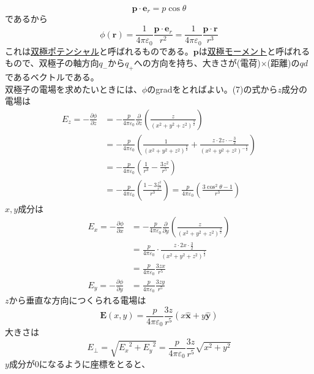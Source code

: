\documentclass{jsarticle}
\begin{document}
\[\bm{p}\cdot\bm{e}_{r}=p\cos\theta\]
であるから
\begin{equation}
\phi(\bm{r})=\frac{1}{4\pi\varepsilon_{0}}\frac{\bm{p}\cdot\bm{e}_{r}}{r^{2}}=\frac{1}{4\pi\varepsilon_{0}}\frac{\bm{p}\cdot\bm{r}}{r^{3}}
\end{equation}
これは\underline{双極ポテンシャル}と呼ばれるものである。\(\bm{p}\)は\underline{双極モーメント}と呼ばれるもので、双極子の軸方向\(q_{-}\)から\(q_{+}\)への方向を持ち、大きさが(電荷)\(\times\)(距離)の\(qd\)であるベクトルである。\\
双極子の電場を求めたいときには、\(\phi\)のgradをとればよい。(7)の式から\(z\)成分の電場は
\begin{align}
E_{z}=-\frac{\partial\phi}{\partial z}&=-\frac{p}{4\pi\varepsilon_{0}}\frac{\partial}{\partial z}\left(\frac{z}{(x^{2}+y^{2}+z^{2})^{\frac{3}{2}}}\right)\nonumber\\
&=-\frac{p}{4\pi\varepsilon_{0}}\left(\frac{1}{(x^{2}+y^{2}+z^{2})^{\frac{3}{2}}}+\frac{z\cdot2z\cdot-\frac{3}{2}}{(x^{2}+y^{2}+z^{2})^{-\frac{5}{2}}}\right)\nonumber\\
&=-\frac{p}{4\pi\varepsilon_{0}}\left(\frac{1}{r^{3}}-\frac{3z^{2}}{r^{5}}\right)\\
&=-\frac{p}{4\pi\varepsilon_{0}}\left(\frac{1-3\frac{z^{2}}{r^{2}}}{r^{3}}\right)=\frac{p}{4\pi\varepsilon_{0}}\left(\frac{3\cos^{2}\theta-1}{r^{3}}\right)
\end{align}
\(x,y\)成分は
\begin{align}
E_{x}=-\frac{\partial\phi}{\partial x}&=-\frac{p}{4\pi\varepsilon_{0}}\frac{\partial}{\partial y}\left(\frac{z}{(x^{2}+y^{2}+z^{2})^{\frac{3}{2}}}\right)\nonumber\\
&=\frac{p}{4\pi\varepsilon_{0}}\cdot\frac{z\cdot 2x\cdot\frac{3}{2}}{(x^{2}+y^{2}+z^{2})^{\frac{5}{2}}}\nonumber\\
&=\frac{p}{4\pi\varepsilon_{0}}\frac{3zx}{r^{5}}\\
E_{y}=-\frac{\partial\phi}{\partial y}&=\frac{p}{4\pi\varepsilon_{0}}\frac{3zy}{r^{5}}
\end{align}
\(z\)から垂直な方向につくられる電場は
\begin{equation}
\bm{E}(x,y)=\frac{p}{4\pi\varepsilon_{0}}\frac{3z}{r^{5}}(x\bm{\hat{x}}+y\bm{\hat{y}})
\end{equation}
大きさは
\begin{equation}
E_{\perp}=\sqrt{{E_{x}}^{2}+{E_{y}}^{2}}=\frac{p}{4\pi\varepsilon_{0}}\frac{3z}{r^{5}}\sqrt{x^{2}+y^{2}}
\end{equation}
\(y\)成分が0になるように座標をとると、
\end{document}
